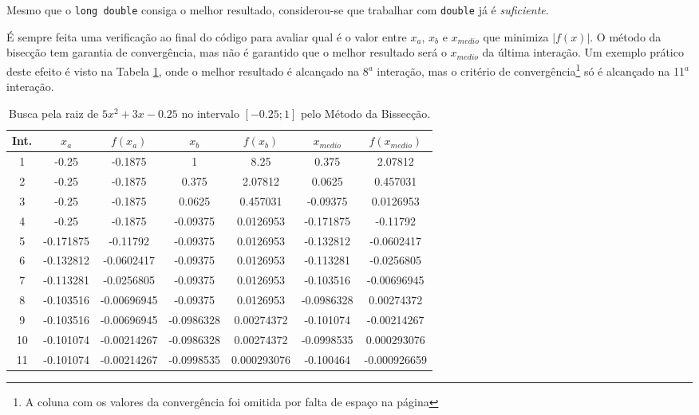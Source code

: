 \documentclass[final,3p,12pt]{elsarticle}
\begin{document}
    Mesmo que o \verb|long double| consiga o melhor resultado, considerou-se que trabalhar com \verb|double| já é \emph{suficiente}.

    É sempre feita uma verificação ao final do código para avaliar qual é o valor entre $x_a$, $x_b$ e $x_{medio}$ que minimiza $|f(x)|$. O método da bisecção tem garantia de convergência, mas não é garantido que o melhor resultado será o $x_{medio}$ da última interação. Um exemplo prático deste efeito é visto na Tabela \ref{table:fQuadratica}, onde o melhor resultado é alcançado na 8$^a$ interação, mas o critério de convergência\footnote{A coluna com os valores da convergência foi omitida por falta de espaço na página} só é alcançado na 11$^a$ interação.
    
    \begin{table}[h!] \label{table:fQuadratica}
        \centering
        \caption{Busca pela raiz de $5x^2+3x-0.25$ no intervalo $[-0.25; 1]$ pelo Método da Bissecção.}
        \begin{tabular}{ c c c c c c c }
            Int. & $x_a$   & $f(x_a)$    & $x_b$      & $f(x_b)$    & $x_{medio}$ & $f(x_{medio})$  \\
            \hline
             1 &     -0.25 &     -0.1875 &          1 &        8.25 &      0.375 &     2.07812   \\
             2 &     -0.25 &     -0.1875 &      0.375 &     2.07812 &     0.0625 &    0.457031   \\
             3 &     -0.25 &     -0.1875 &     0.0625 &    0.457031 &   -0.09375 &   0.0126953   \\
             4 &     -0.25 &     -0.1875 &   -0.09375 &   0.0126953 &  -0.171875 &    -0.11792   \\
             5 & -0.171875 &    -0.11792 &   -0.09375 &   0.0126953 &  -0.132812 &  -0.0602417   \\
             6 & -0.132812 &  -0.0602417 &   -0.09375 &   0.0126953 &  -0.113281 &  -0.0256805   \\
             7 & -0.113281 &  -0.0256805 &   -0.09375 &   0.0126953 &  -0.103516 & -0.00696945   \\
             8 & -0.103516 & -0.00696945 &   -0.09375 &   0.0126953 & -0.0986328 &  0.00274372   \\
             9 & -0.103516 & -0.00696945 & -0.0986328 &  0.00274372 &  -0.101074 & -0.00214267   \\
            10 & -0.101074 & -0.00214267 & -0.0986328 &  0.00274372 & -0.0998535 & 0.000293076   \\
            11 & -0.101074 & -0.00214267 & -0.0998535 & 0.000293076 &  -0.100464 & -0.000926659 
        \end{tabular}
    \end{table}
    
\end{document}
